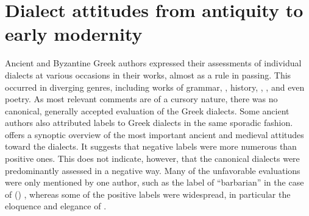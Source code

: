 \section{Dialect attitudes from antiquity to early modernity}\label{sec:7.2}


Ancient and Byzantine Greek authors expressed their assessments of individual dialects at various occasions in their works, almost as a rule in passing. This occurred in diverging genres, including works of grammar, , history, , , and even poetry. As most relevant comments are of a cursory nature, there was no canonical, generally accepted evaluation of the Greek dialects. Some ancient  authors also attributed labels to Greek dialects in the same sporadic fashion.  offers a synoptic overview of the most important ancient and medieval attitudes toward the dialects. It suggests that negative labels were more numerous than positive ones. This does not indicate, however, that the canonical dialects were predominantly assessed in a negative way. Many of the unfavorable evaluations were only mentioned by one author, such as the label of “barbarian” in the case of () , whereas some of the positive labels were widespread, in particular the eloquence and elegance of .


